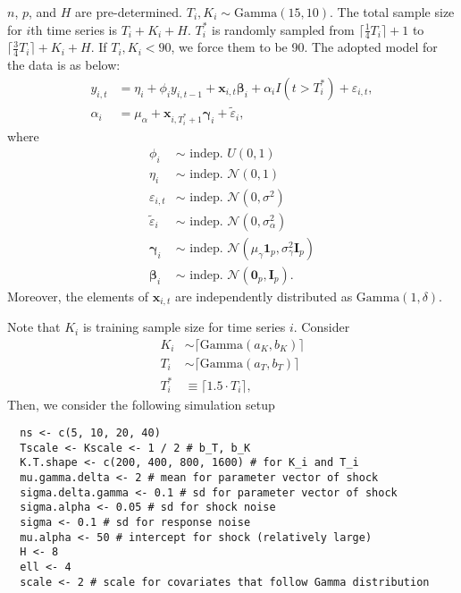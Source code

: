 \documentclass[12pt]{article}
\def\mbf#1{\mathbf{#1}} %
\def\mrm#1{\mathrm{#1}} %
\def\mc#1{\mathcal{#1}} %
\def\mc#1{\mathcal{#1}}
\def\bs#1{\boldsymbol{#1}}
\newcommand{\ceil}[1]{\lceil #1 \rceil}
\theoremstyle{definition}
\theoremstyle{definition}
\begin{document}
$n$, $p$, and $H$ are pre-determined. $T_i, K_i \sim \mrm{Gamma}(15, 10)$.  The total sample size for $i$th time series is $T_i + K_i + H$. $T_i^*$ is randomly sampled from $\ceil{\frac{1}{4}T_i}+1$ to $\ceil{\frac{3}{4} T_i} + K_i+ H$. If $T_i, K_i < 90$, we force them to be 90. The adopted model for the data is as below:
\begin{align*}
  y_{i,t} &= \eta_i + \phi_i y_{i,t-1} + \mbf{x}_{i,t} \bs{\beta}_i + \alpha_i I(t > T_i^*) + \varepsilon_{i,t},\\
  \alpha_i &= \mu_{\alpha} + \mbf{x}_{i,T_i^*+1}\bs{\gamma}_i + \tilde{\varepsilon}_{i},
\end{align*}
where
\begin{align*}
  \phi_i & \sim \text{ indep. }  U(0,1) \\
  \eta_i & \sim \text{ indep. }  \mc{N}(0,1) \\
  \varepsilon_{i,t} & \sim \text{ indep. } \mc{N}(0, \sigma^2)\\
  \tilde{\varepsilon}_i & \sim \text{ indep. } \mc{N}(0, \sigma_{\alpha}^2)
  \\
  \bs{\gamma}_i & \sim \text{ indep. } \mc{N}(\mu_{\gamma}\bs{1}_p, \sigma_{\gamma}^2 \mbf{I}_p) \\
  \bs{\beta}_i & \sim \text{ indep. }  \mc{N}(\bs{0}_p, \mbf{I}_p).
\end{align*}
Moreover, the elements of $\mathbf{x}_{i,t}$ are independently distributed as $\mrm{Gamma}(1,\delta)$.

Note that $K_i$ is training sample size for time series $i$. Consider
\begin{align*}
  K_i & \sim \ceil{\mrm{Gamma}(a_{K}, b_K)}\\
   T_i & \sim \ceil{\mrm{Gamma}(a_{T}, b_T)} \\
  T_i^* &\equiv \ceil{1.5 \cdot T_i},
\end{align*}
 Then, we consider the following simulation setup
\begin{verbatim}
  ns <- c(5, 10, 20, 40)
  Tscale <- Kscale <- 1 / 2 # b_T, b_K 
  K.T.shape <- c(200, 400, 800, 1600) # for K_i and T_i
  mu.gamma.delta <- 2 # mean for parameter vector of shock
  sigma.delta.gamma <- 0.1 # sd for parameter vector of shock
  sigma.alpha <- 0.05 # sd for shock noise  
  sigma <- 0.1 # sd for response noise
  mu.alpha <- 50 # intercept for shock (relatively large)
  H <- 8 
  ell <- 4
  scale <- 2 # scale for covariates that follow Gamma distribution
\end{verbatim}
\end{document}
